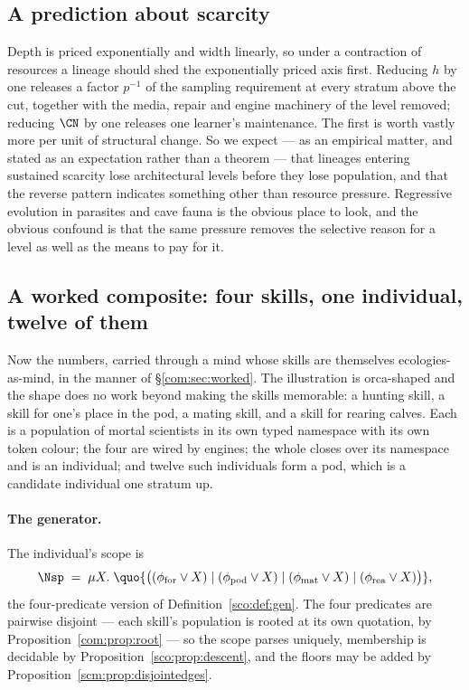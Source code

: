 \subsection{A prediction about scarcity}

\begin{remark}
\label{scm:rmk:shed}
Depth is priced exponentially and width linearly, so under a contraction
of resources a lineage should shed the exponentially priced axis first.
Reducing $h$ by one releases a factor $p^{-1}$ of the sampling requirement
at every stratum above the cut, together with the media, repair and engine
machinery of the level removed; reducing $\CN$ by one releases one
learner's maintenance. The first is worth vastly more per unit of
structural change. So we expect --- as an empirical matter, and stated as
an expectation rather than a theorem --- that lineages entering sustained
scarcity lose architectural levels before they lose population, and that
the reverse pattern indicates something other than resource pressure.
Regressive evolution in parasites and cave fauna is the obvious place to
look, and the obvious confound is that the same pressure removes the
selective reason for a level as well as the means to pay for it.
\end{remark}

\subsection{A worked composite: four skills, one individual, twelve of them}
\label{scm:sec:composite}

Now the numbers, carried through a mind whose skills are themselves
ecologies-as-mind, in the manner of \S\ref{com:sec:worked}. The
illustration is orca-shaped and the shape does no work beyond making the
skills memorable: a hunting skill, a skill for one's place in the pod, a
mating skill, and a skill for rearing calves. Each is a population of
mortal scientists in its own typed namespace with its own token colour;
the four are wired by engines; the whole closes over its namespace and is
an individual; and twelve such individuals form a pod, which is a
candidate individual one stratum up.

\paragraph{The generator.}
The individual's scope is
\[
  \Nsp \;=\; \mu X.\;
  \quo{\bigl( (\phi_{\mathrm{for}} \lor X) \mid
              (\phi_{\mathrm{pod}} \lor X) \mid
              (\phi_{\mathrm{mat}} \lor X) \mid
              (\phi_{\mathrm{rea}} \lor X) \bigr)},
\]
the four-predicate version of Definition~\ref{sco:def:gen}. The four
predicates are pairwise disjoint --- each skill's population is rooted at
its own quotation, by Proposition~\ref{com:prop:root} --- so the scope
parses uniquely, membership is decidable by
Proposition~\ref{sco:prop:descent}, and the floors may be added by
Proposition~\ref{scm:prop:disjointedges}.

